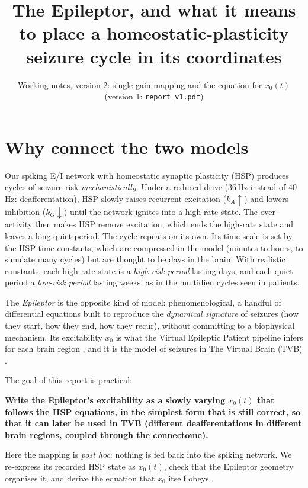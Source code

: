 \documentclass[11pt]{article}
\title{The Epileptor, and what it means to place a homeostatic-plasticity\\ seizure cycle in its coordinates}
\author{}
\date{Working notes, version 2: single-gain mapping and the equation for $x_0(t)$\\ (version 1: \texttt{report\_v1.pdf})}
\newcommand{\kA}{k_A}
\newcommand{\kG}{k_G}
\newcommand{\keybox}[1]{\par\noindent\colorbox{boxc}{\parbox{\dimexpr\linewidth-2\fboxsep}{\small #1}}\par\medskip}
\begin{document}
\maketitle
\tableofcontents
\newpage

\section{Why connect the two models}
Our spiking E/I network with homeostatic synaptic plasticity (HSP) produces cycles of seizure risk
\emph{mechanistically}. Under a reduced drive (36\,Hz instead of 40\,Hz: deafferentation), HSP slowly raises recurrent
excitation ($\kA\uparrow$) and lowers inhibition ($\kG\downarrow$) until the network ignites into a high-rate state. The
over-activity then makes HSP remove excitation, which ends the high-rate state and leaves a long quiet period. The cycle
repeats on its own. Its time scale is set by the HSP time constants, which are compressed in the model (minutes to hours,
to simulate many cycles) but are thought to be days in the brain. With realistic constants, each high-rate state is a
\emph{high-risk period} lasting days, and each quiet period a \emph{low-risk period} lasting weeks, as in the multidien
cycles seen in patients.

The \emph{Epileptor} \cite{jirsa2014} is the opposite kind of model: phenomenological, a handful of differential
equations built to reproduce the \emph{dynamical signature} of seizures (how they start, how they end, how they recur),
without committing to a biophysical mechanism. Its excitability $x_0$ is what the Virtual Epileptic Patient pipeline
infers for each brain region \cite{jirsa2017,proix2017}, and it is the model of seizures in The Virtual Brain (TVB)
\cite{sanzleon2013}.

The goal of this report is practical:
\keybox{\textbf{Write the Epileptor's excitability as a slowly varying $x_0(t)$ that follows the HSP equations, in the
simplest form that is still correct, so that it can later be used in TVB (different deafferentations in different brain
regions, coupled through the connectome).}}
Here the mapping is \emph{post hoc}: nothing is fed back into the spiking network. We re-express its recorded HSP state as
$x_0(t)$, check that the Epileptor geometry organises it, and derive the equation that $x_0$ itself obeys.
\end{document}
